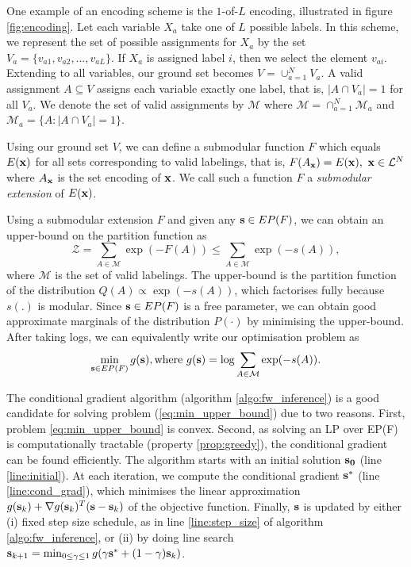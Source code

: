 One example of an encoding scheme is the $1$-of-$L$ encoding, illustrated in figure \ref{fig:encoding}. Let each variable $X_a$ take one of $L$ possible labels. In this scheme, we represent the set of possible assignments for $X_a$ by the set $V_a = \{v_{a1}, v_{a2}, \dots, v_{aL}\}$. If $X_a$ is assigned label $i$, then we select the element $v_{ai}$. Extending to all variables, our ground set becomes $V = \cup_{a = 1}^N V_a$. A valid assignment $A \subseteq V$ assigns each variable exactly one label, that is, $|A \cap V_a| = 1$ for all $V_a$. We denote the set of valid assignments by $\mathcal M$ where $\mathcal{M} = \cap_{a = 1}^{N} \mathcal{M}_a$ and $\mathcal{M}_a = \{A: |A \cap V_a| = 1\}$.


Using our ground set $V$, we can define a submodular function $F$ which equals $E(\bf x)$ for all sets corresponding to valid labelings, that is, $F(A_{\bf x}) = E({\bf x}),\ {\bf x} \in {\mathcal L}^N$ where $A_{\bf x}$ is the set encoding of $\bf x$. We call such a function $F$ a {\it submodular extension} of $E({\bf x})$. 

 Using a submodular extension $F$ and given any ${\bf s} \in EP(F)$, we can obtain an upper-bound on the partition function as
\begin{equation}
    {\mathcal Z} = \sum_{A \in {\mathcal M}} \exp(-F(A)) \leq \sum_{A \in {\mathcal M}} \exp(-s(A)),
\end{equation}
where $\mathcal M$ is the set of valid labelings. The upper-bound is the partition function of the distribution $Q(A) \propto \exp(-s(A))$, which factorises fully because $s(.)$ is modular. Since ${\bf s} \in EP(F)$ is a free parameter, we can obtain good approximate marginals of the distribution $P(\cdot)$ by minimising the upper-bound. After taking logs, we can equivalently write our optimisation problem as
\begin{equation}
  \min_{{\bf s} \in EP(F)} g({\bf s}), \text{where } g({\bf s}) = \log \sum_{A \in {\mathcal M}} \exp(-s(A)).
\label{eq:min_upper_bound}
\end{equation}

 The conditional gradient algorithm
(algorithm \ref{algo:fw_inference}) \citep{frank1956algorithm} is a good
candidate for solving problem (\ref{eq:min_upper_bound}) due to two reasons.
First, problem \eqref{eq:min_upper_bound} is convex. Second, as solving an LP over EP(F) is computationally tractable (property \ref{prop:greedy}), the conditional gradient can be found efficiently. The algorithm starts with an initial solution $\bf s_0$ (line \ref{line:initial}). At each iteration, we compute the conditional gradient $\bf s^*$ (line \ref{line:cond_grad}), which minimises the linear approximation $g({\bf s}_k) + \nabla g({\bf s}_k)^T ({\bf s} - {\bf s}_k)$ of the objective function. Finally, $\bf s$ is updated by either (i) fixed step size schedule, as in line \ref{line:step_size} of algorithm \ref{algo:fw_inference}, or (ii) by doing line search ${\bf s}_{k+1} = \min_{0 \leq \gamma \leq 1} g(\gamma {\bf s}^* + (1 - \gamma) {\bf s}_{k})$.

